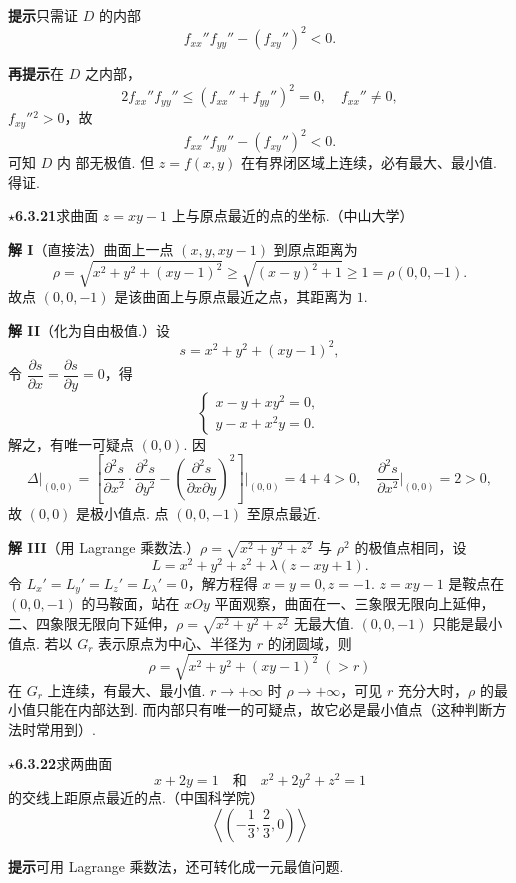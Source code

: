 \documentclass[UTF8, 12pt, fontset=fandol, oneside]{ctexart}
\begin{document}
\noindent\textbf{提示}\quad 只需证 $D$ 的内部
\[
  f_{xx}''f_{yy}''-(f_{xy}'')^2<0.
\]

\noindent\textbf{再提示}\quad 在 $D$ 之内部，
\[
  2f_{xx}''f_{yy}''\le(f_{xx}''+f_{yy}'')^2=0,\quad f_{xx}''\ne0,
\]
$f_{xy}''{}^2>0$，故
\[
  f_{xx}''f_{yy}''-(f_{xy}'')^2<0.
\]
可知 $D$ 内
部无极值. 但 $z=f(x,y)$ 在有界闭区域上连续，必有最大、最小值. 得证.

\noindent\textbf{\ensuremath{\star}6.3.21}\quad 求曲面 $z=xy-1$ 上与原点最近的点的坐标.（中山大学）

\noindent\textbf{解 I}\quad （直接法）曲面上一点 $(x,y,xy-1)$ 到原点距离为
\[
  \rho=\sqrt{x^2+y^2+(xy-1)^2}
  \ge\sqrt{(x-y)^2+1}\ge1=\rho(0,0,-1).
\]
故点 $(0,0,-1)$ 是该曲面上与原点最近之点，其距离为 $1$.

\noindent\textbf{解 II}\quad （化为自由极值.）设
\[
  s=x^2+y^2+(xy-1)^2,
\]
令 $\dfrac{\partial s}{\partial x}=\dfrac{\partial s}{\partial y}=0$，得
\[
  \begin{cases}
    x-y+xy^2=0,\\
    y-x+x^2y=0.
  \end{cases}
\]
解之，有唯一可疑点 $(0,0)$. 因
\[
  \Delta\big|_{(0,0)}
  =\left[\frac{\partial^2s}{\partial x^2}\cdot
  \frac{\partial^2s}{\partial y^2}
  -\left(\frac{\partial^2s}{\partial x\partial y}\right)^2\right]\bigg|_{(0,0)}
  =4+4>0,\quad
  \frac{\partial^2s}{\partial x^2}\bigg|_{(0,0)}=2>0,
\]
故 $(0,0)$ 是极小值点. 点 $(0,0,-1)$ 至原点最近.

\noindent\textbf{解 III}\quad （用 Lagrange 乘数法.）$\rho=\sqrt{x^2+y^2+z^2}$ 与 $\rho^2$ 的极值点相同，设
\[
  L=x^2+y^2+z^2+\lambda(z-xy+1).
\]
令 $L_x'=L_y'=L_z'=L_\lambda'=0$，解方程得 $x=y=0,z=-1$. $z=xy-1$ 是鞍点在 $(0,0,-1)$ 的马鞍面，站在 $xOy$ 平面观察，曲面在一、三象限无限向上延伸，二、四象限无限向下延伸，$\rho=\sqrt{x^2+y^2+z^2}$ 无最大值. $(0,0,-1)$ 只能是最小值点. 若以 $G_r$ 表示原点为中心、半径为 $r$ 的闭圆域，则
\[
  \rho=\sqrt{x^2+y^2+(xy-1)^2}\ (>r)
\]
在 $G_r$ 上连续，有最大、最小值. $r\to+\infty$ 时 $\rho\to+\infty$，可见 $r$ 充分大时，$\rho$ 的最小值只能在内部达到. 而内部只有唯一的可疑点，故它必是最小值点（这种判断方法时常用到）.

\noindent\textbf{\ensuremath{\star}6.3.22}\quad 求两曲面
\[
  x+2y=1\quad\text{和}\quad x^2+2y^2+z^2=1
\]
的交线上距原点最近的点.（中国科学院）
\[
  \left\langle\left(-\frac13,\frac23,0\right)\right\rangle
\]

\noindent\textbf{提示}\quad 可用 Lagrange 乘数法，还可转化成一元最值问题.
\end{document}
